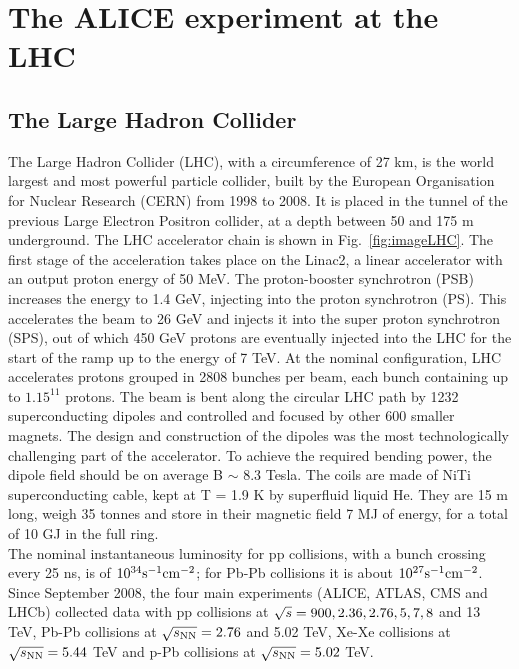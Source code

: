 \chapter{The ALICE experiment at the LHC}
\label{chap:chap3}

\section{The Large Hadron Collider}
\label{sec:LHC}
The Large Hadron Collider (LHC), with a circumference of 27 km, 
is the world largest and most powerful particle collider, built by the 
European Organisation for Nuclear Research (CERN) from 1998 to 2008. 
It is placed in the tunnel of the previous Large Electron Positron collider, at a depth between 50 and 175 m underground.
The LHC accelerator chain is shown in Fig.~\ref{fig:imageLHC}. The first stage 
of the acceleration takes place on the Linac2, a linear accelerator with an 
output proton energy of 50 MeV. The proton-booster synchrotron (PSB) increases 
the energy to 1.4 GeV, injecting into the proton synchrotron (PS). This accelerates the
 beam to 26 GeV and injects it into the super proton synchrotron (SPS), out of which 
 450 GeV protons are eventually injected into the LHC for the start of the ramp up to 
 the energy of 7 TeV. At the nominal configuration, LHC accelerates protons grouped in 2808 bunches per beam, each bunch 
 containing up to $1.15^{11}$ protons. The beam is bent along the circular LHC 
 path by 1232 superconducting dipoles and controlled and focused by other 
 600 smaller magnets. The design and construction of the dipoles was the most 
 technologically challenging part of the accelerator. To achieve the required bending power, 
 the dipole field should be on average B $\sim$ 8.3 Tesla. The coils are made of 
 NiTi superconducting cable, kept at T = 1.9 K by superfluid liquid He. They are 
 15 m long, weigh 35 tonnes and store in their magnetic field 7 MJ of energy, for a total of 10 GJ in the full ring.\\
The nominal instantaneous luminosity for pp collisions, with a bunch crossing every 25 ns, is of $10^{34} {\rm s}^{-1} {\rm cm}^{-2}$; for 
Pb-Pb collisions it is about $10^{27} {\rm s}^{-1} {\rm cm}^{-2}$. Since September 2008, 
the four main experiments (ALICE, ATLAS, CMS and LHCb) collected data with pp
 collisions at $\sqrt{s}=900, 2.36, 2.76, 5, 7, 8$ and 13 TeV, 
 Pb-Pb collisions at $\sqrt{s_{\rm NN}}=2.76$ and 5.02 TeV, Xe-Xe collisions at $\sqrt{s_{\rm NN}}=5.44$ TeV and p-Pb collisions at $\sqrt{s_{\rm NN}}=5.02$ TeV.

